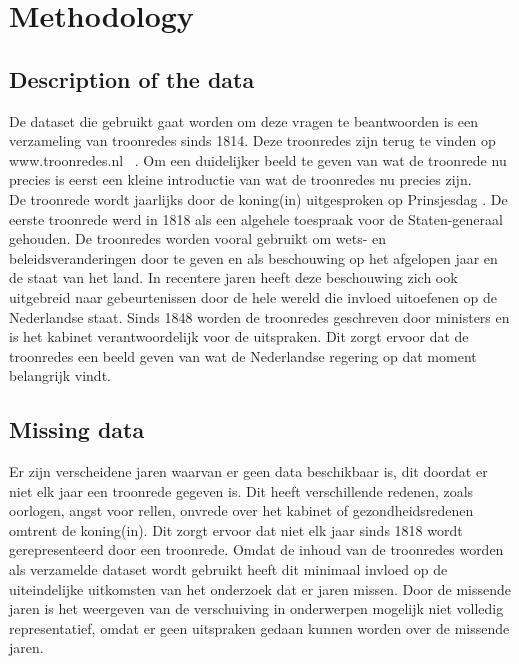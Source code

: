 \section{Methodology}
\label{sec:meth}


\subsection{Description of the data}
De dataset die gebruikt gaat worden om deze vragen te beantwoorden is een verzameling van troonredes sinds 1814. Deze troonredes zijn terug te vinden op www.troonredes.nl~\citep{troonredes} . Om een duidelijker beeld te geven van wat de troonrede nu precies is eerst een kleine introductie van wat de troonredes nu precies zijn. 
\\
De troonrede wordt jaarlijks door de koning(in) uitgesproken op Prinsjesdag . De eerste troonrede werd in 1818 als een algehele toespraak voor de Staten-generaal gehouden. De troonredes worden vooral gebruikt om wets- en beleidsveranderingen
door te geven en als beschouwing op het afgelopen jaar en de staat van het land.  In recentere jaren heeft deze beschouwing zich ook uitgebreid naar gebeurtenissen door de hele wereld die invloed uitoefenen op de Nederlandse staat. Sinds 1848 worden de troonredes geschreven door ministers  en is het kabinet verantwoordelijk voor de uitspraken. Dit zorgt ervoor dat de troonredes een beeld geven van wat de Nederlandse regering op dat moment belangrijk vindt.

\subsection{Missing data}
Er zijn verscheidene jaren waarvan er geen data beschikbaar is, dit doordat er niet elk jaar een troonrede gegeven is. Dit heeft verschillende redenen, zoals oorlogen, angst voor rellen, onvrede over het kabinet of gezondheidsredenen omtrent de koning(in). Dit zorgt ervoor dat niet elk jaar sinds 1818 wordt gerepresenteerd door een troonrede. Omdat de inhoud van de troonredes worden   als
verzamelde dataset wordt gebruikt heeft dit minimaal invloed op de uiteindelijke uitkomsten van het onderzoek dat er jaren missen. Door de missende jaren is het weergeven van de verschuiving in onderwerpen mogelijk niet volledig representatief, omdat er geen uitspraken gedaan kunnen worden over de missende jaren.


